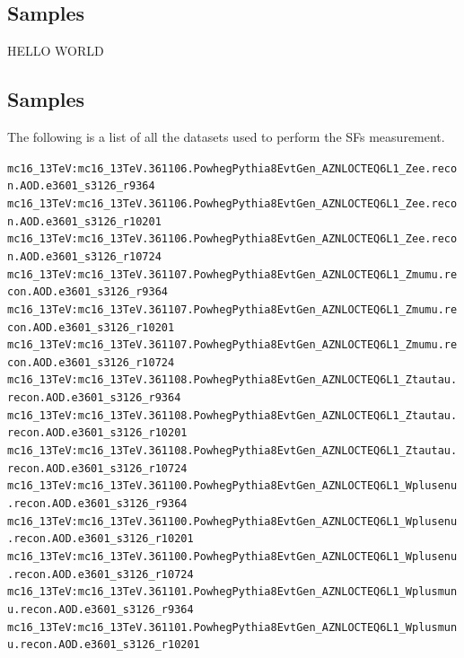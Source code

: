 \subsection{Samples}\label{RatiosTables}
HELLO WORLD
\subsection{Samples}\label{SampleFiles}
The following is a list of all the datasets used to perform the SFs measurement.

\fontsize{0.3cm}{0.3cm}\texttt{mc16\_13TeV:mc16\_13TeV.361106.PowhegPythia8EvtGen\_AZNLOCTEQ6L1\_Zee.recon.AOD.e3601\_s3126\_r9364\newline   
 mc16\_13TeV:mc16\_13TeV.361106.PowhegPythia8EvtGen\_AZNLOCTEQ6L1\_Zee.recon.AOD.e3601\_s3126\_r10201\newline   
 mc16\_13TeV:mc16\_13TeV.361106.PowhegPythia8EvtGen\_AZNLOCTEQ6L1\_Zee.recon.AOD.e3601\_s3126\_r10724\newline   
 mc16\_13TeV:mc16\_13TeV.361107.PowhegPythia8EvtGen\_AZNLOCTEQ6L1\_Zmumu.recon.AOD.e3601\_s3126\_r9364\newline   
 mc16\_13TeV:mc16\_13TeV.361107.PowhegPythia8EvtGen\_AZNLOCTEQ6L1\_Zmumu.recon.AOD.e3601\_s3126\_r10201\newline    
 mc16\_13TeV:mc16\_13TeV.361107.PowhegPythia8EvtGen\_AZNLOCTEQ6L1\_Zmumu.recon.AOD.e3601\_s3126\_r10724\newline    
 mc16\_13TeV:mc16\_13TeV.361108.PowhegPythia8EvtGen\_AZNLOCTEQ6L1\_Ztautau.recon.AOD.e3601\_s3126\_r9364\newline    
 mc16\_13TeV:mc16\_13TeV.361108.PowhegPythia8EvtGen\_AZNLOCTEQ6L1\_Ztautau.recon.AOD.e3601\_s3126\_r10201\newline    
 mc16\_13TeV:mc16\_13TeV.361108.PowhegPythia8EvtGen\_AZNLOCTEQ6L1\_Ztautau.recon.AOD.e3601\_s3126\_r10724\newline    
 mc16\_13TeV:mc16\_13TeV.361100.PowhegPythia8EvtGen\_AZNLOCTEQ6L1\_Wplusenu.recon.AOD.e3601\_s3126\_r9364\newline    
 mc16\_13TeV:mc16\_13TeV.361100.PowhegPythia8EvtGen\_AZNLOCTEQ6L1\_Wplusenu.recon.AOD.e3601\_s3126\_r10201\newline    
 mc16\_13TeV:mc16\_13TeV.361100.PowhegPythia8EvtGen\_AZNLOCTEQ6L1\_Wplusenu.recon.AOD.e3601\_s3126\_r10724\newline    
 mc16\_13TeV:mc16\_13TeV.361101.PowhegPythia8EvtGen\_AZNLOCTEQ6L1\_Wplusmunu.recon.AOD.e3601\_s3126\_r9364\newline    
 mc16\_13TeV:mc16\_13TeV.361101.PowhegPythia8EvtGen\_AZNLOCTEQ6L1\_Wplusmunu.recon.AOD.e3601\_s3126\_r10201\newline    
}
